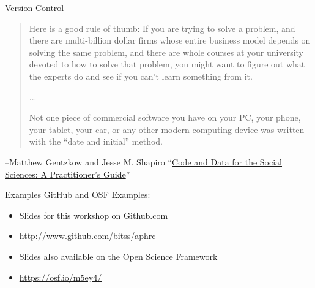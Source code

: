\documentclass{beamer}
\begin{document}
\begin{frame}{Version Control}
\begin{quote}Here is a good rule of thumb: If you are trying to solve a problem, and there are multi-billion dollar  firms  whose  entire  business  model  depends  on  solving  the  same  problem,  and  there  are whole courses at your university devoted to how to solve that problem, you might want to figure out what the experts do and see if you can’t learn something from it.

...

Not one piece of commercial software you have on your PC, your phone, your tablet,
your car, or any other modern computing device was written with the “date and initial” method.
\end{quote}
--Matthew Gentzkow and Jesse M. Shapiro ``\href{http://web.stanford.edu/~gentzkow/research/CodeAndData.pdf}{Code and Data for the Social Sciences: A Practitioner's Guide}''
\end{frame}


{ %
    \begin{frame}[plain]
     \end{frame}

    \begin{frame}[plain]
     \end{frame}
 
    \begin{frame}[plain]
     \end{frame}
}
\begin{frame}{Examples}
GitHub and OSF Examples:
\begin{itemize}
\item
Slides for this workshop on Github.com
\item \url{http://www.github.com/bitss/aphrc}
\item
Slides also available on the Open Science Framework
 \item \url{https://osf.io/m5ey4/}
\end{itemize}
\end{frame}
\end{document}
